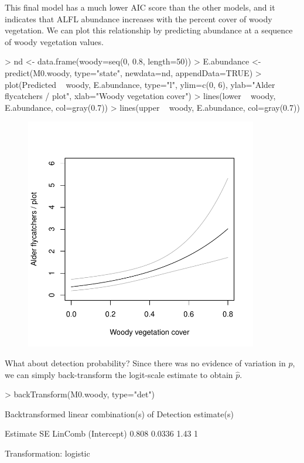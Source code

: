 \documentclass[a4paper]{article}
\renewenvironment{Schunk}{\vspace{\topsep}}{\vspace{\topsep}}
\begin{document}
This final model has a much lower AIC score than the other models, and
it indicates
that ALFL abundance increases with the percent cover
of woody vegetation. We can plot this relationship by predicting
abundance at a sequence of woody vegetation values.
\begin{Schunk}
\begin{Sinput}
> nd <- data.frame(woody=seq(0, 0.8, length=50))
> E.abundance <- predict(M0.woody, type="state", newdata=nd, appendData=TRUE)
> plot(Predicted ~ woody, E.abundance, type="l", ylim=c(0, 6),
      ylab="Alder flycatchers / plot", xlab="Woody vegetation cover")
> lines(lower ~ woody, E.abundance, col=gray(0.7))
> lines(upper ~ woody, E.abundance, col=gray(0.7))
\end{Sinput}
\end{Schunk}
\begin{figure}[h!]
  \begin{center}
    \includegraphics[width=4in,height=4in]{cap-recap-woody}
  \end{center}
\end{figure}

\newpage

What about detection probability? Since there was no evidence of
variation in $p$, we can simply back-transform the logit-scale estimate
to obtain $\hat{p}$.

\begin{Schunk}
\begin{Sinput}
> backTransform(M0.woody, type="det")
\end{Sinput}
\begin{Soutput}
Backtransformed linear combination(s) of Detection estimate(s)

 Estimate     SE LinComb (Intercept)
    0.808 0.0336    1.43           1

Transformation: logistic 
\end{Soutput}
\end{Schunk}
\end{document}
